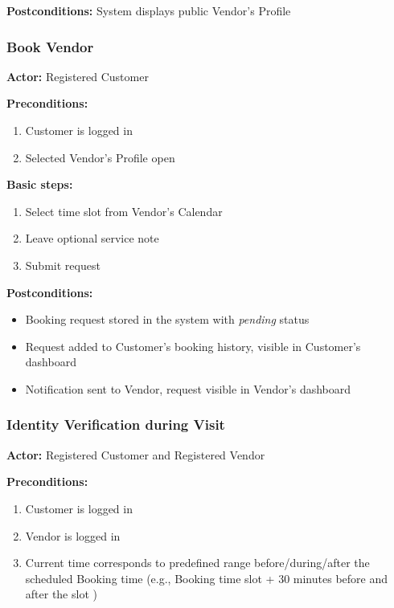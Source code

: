 \documentclass[11pt,a4paper]{article}
\begin{document}
\noindent \textbf{Postconditions:} System displays public Vendor's Profile

\subsubsection{Book Vendor}

\textbf{Actor:} Registered Customer

\noindent \textbf{Preconditions:}
\begin{enumerate}
  \item Customer is logged in
  \item Selected Vendor's Profile open
\end{enumerate}

\noindent \textbf{Basic steps:}
\begin{enumerate}
  \item Select time slot from Vendor's Calendar
  \item Leave optional service note
  \item Submit request
\end{enumerate}

\noindent \textbf{Postconditions:}
\begin{itemize}
  \item Booking request stored in the system with \textit{pending} status
  \item Request added to Customer's booking history, visible in
    Customer's dashboard
  \item Notification sent to Vendor, request visible in Vendor's dashboard
\end{itemize}


\subsubsection{Identity Verification during Visit}

\textbf{Actor:} Registered Customer and Registered Vendor

\noindent \textbf{Preconditions:}
\begin{enumerate}
  \item Customer is logged in
  \item Vendor is logged in
  \item Current time corresponds to predefined range before/during/after the scheduled Booking time (e.g., Booking time slot + 30 minutes before and after the slot )
\end{enumerate}
\end{document}
